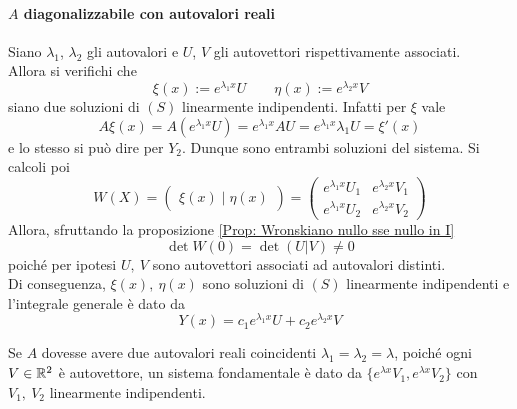 \paragraph{$A$ diagonalizzabile con autovalori reali}
Siano $\lambda_1$, $\lambda_2$ gli autovalori e $U$, $V$ gli autovettori rispettivamente associati.\\
Allora si verifichi che
\begin{equation*}
   \xi(x):= e^{\lambda_1 x}U \qquad
   \eta(x):= e^{\lambda_2 x}V
\end{equation*}
siano due soluzioni di $(S)$ linearmente indipendenti.
Infatti per $\xi$ vale
\begin{equation*}
    A\xi(x)=A(e^{\lambda_1 x}U)=e^{\lambda_1 x}AU = e^{\lambda_1 x} \lambda_1 U = \xi'(x)
\end{equation*}
e lo stesso si può dire per $Y_2$. Dunque sono entrambi soluzioni del sistema.
Si calcoli poi 
\begin{equation*}
    W(X)=\begin{pmatrix}
        \xi(x) \mid \eta(x)
    \end{pmatrix} = \begin{pmatrix}
        e^{\lambda_1 x} U_1 & e^{\lambda_2 x} V_1 \\
        e^{\lambda_1 x} U_2 & e^{\lambda_2 x} V_2
    \end{pmatrix}
\end{equation*}
Allora, sfruttando la proposizione \ref{Prop: Wronskiano nullo sse nullo in I}
\begin{equation*}
    \det W(0)=\det(U | V) \neq 0
\end{equation*}
poiché per ipotesi $U,\ V$ sono autovettori associati ad autovalori distinti.\\
Di conseguenza, $\xi(x),\ \eta(x)$ sono soluzioni di $(S)$ linearmente indipendenti e l'integrale generale è dato da
\begin{equation*}
    Y(x)= c_1 e^{\lambda_1 x}U + c_2 e^{\lambda_2 x}V
\end{equation*}
\begin{oss}
    Se $A$ dovesse avere due autovalori reali coincidenti $\lambda_1=\lambda_2=\lambda$, poiché ogni $V \in \mathbb{R}^2$ è autovettore, un sistema fondamentale è dato da $\{e^{\lambda x}V_1, e^{\lambda x}V_2\}$ con $V_1,\ V_2$ linearmente indipendenti.
\end{oss}
